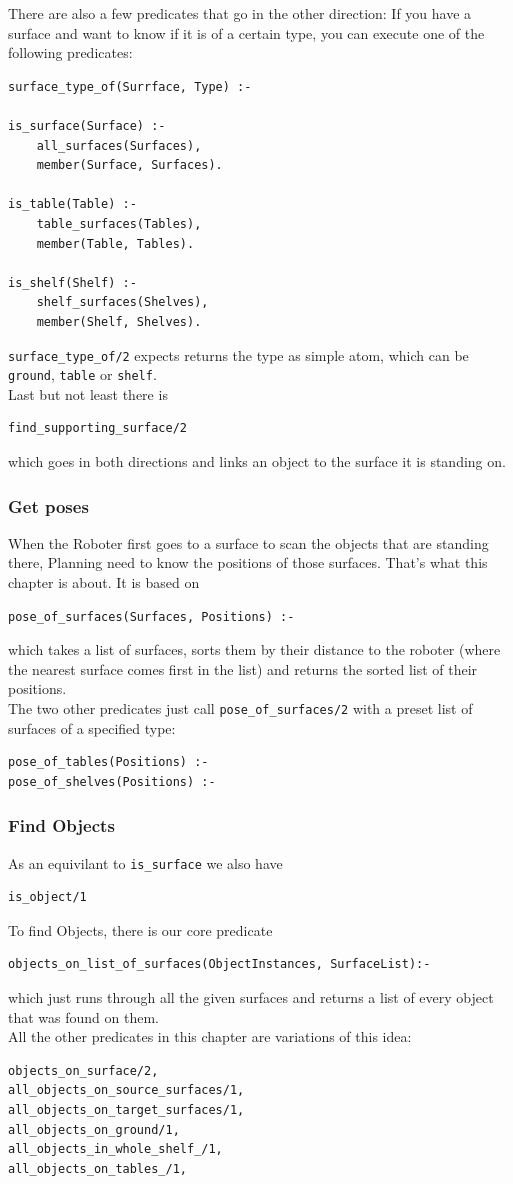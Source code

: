 \documentclass[main.tex]{subfiles}
\begin{document}
There are also a few predicates that go in the other direction: If you have a surface and want to know if it is of a certain type, you can execute one of the following predicates:
\begin{lstlisting}
surface_type_of(Surrface, Type) :-

is_surface(Surface) :-
    all_surfaces(Surfaces),
    member(Surface, Surfaces).

is_table(Table) :-
    table_surfaces(Tables),
    member(Table, Tables).

is_shelf(Shelf) :-
    shelf_surfaces(Shelves),
    member(Shelf, Shelves).
\end{lstlisting}
\texttt{surface\_type\_of/2} expects returns the type as simple atom, which can be \texttt{ground}, \texttt{table} or \texttt{shelf}.\\
Last but not least there is 
\begin{lstlisting}
find_supporting_surface/2
\end{lstlisting}
which goes in both directions and links an object to the surface it is standing on.

\subsubsection{Get poses}
When the Roboter first goes to a surface to scan the objects that are standing there, Planning need to know the positions of those surfaces. That's what this chapter is about. It is based on
\begin{lstlisting}
pose_of_surfaces(Surfaces, Positions) :-
\end{lstlisting}
which takes a list of surfaces, sorts them by their distance to the roboter (where the nearest surface comes first in the list) and returns the sorted list of their positions.\\
The two other predicates just call \texttt{pose\_of\_surfaces/2} with a preset list of surfaces of a specified type:
\begin{lstlisting}
pose_of_tables(Positions) :-
pose_of_shelves(Positions) :-
\end{lstlisting}

\subsubsection{Find Objects}
As an equivilant to \texttt{is\_surface} we also have
\begin{lstlisting}
is_object/1
\end{lstlisting}
To find Objects, there is our core predicate
\begin{lstlisting}
objects_on_list_of_surfaces(ObjectInstances, SurfaceList):-
\end{lstlisting}
which just runs through all the given surfaces and returns a list of every object that was found on them.\\
All the other predicates in this chapter are variations of this idea:
\begin{lstlisting}
objects_on_surface/2,
all_objects_on_source_surfaces/1,
all_objects_on_target_surfaces/1,
all_objects_on_ground/1,
all_objects_in_whole_shelf_/1,
all_objects_on_tables_/1,
\end{lstlisting}
\end{document}
